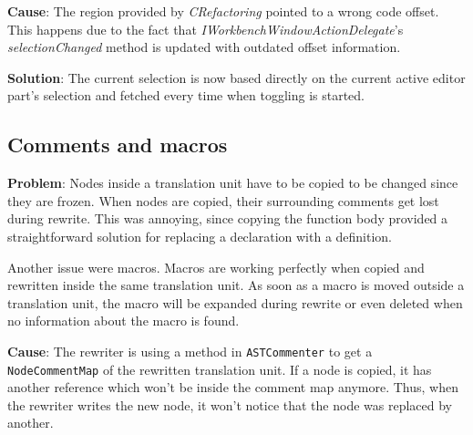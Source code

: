 \textbf{Cause}: The region provided by \textit{CRefactoring} pointed to a wrong 
code offset. This happens due to the fact that 
\textit{IWorkbenchWindowActionDelegate}'s \textit{selectionChanged} method is 
updated with outdated offset information.

\textbf{Solution}: The current selection is now based directly on the current 
active editor part's selection and fetched every time when toggling is started.

\subsection{Comments and macros}
\textbf{Problem}: Nodes inside a translation unit have to be copied to be 
changed since they are frozen. When nodes are copied, their surrounding comments 
get lost during rewrite\cite{Sommerlad:2008:RCR:1449814.1449817}. This was
annoying, since copying the function body provided a straightforward solution
for replacing a declaration with a definition.

Another issue were macros. Macros are working perfectly when copied and 
rewritten inside the same translation unit. As soon as a macro is moved outside 
a translation unit, the macro will be expanded during rewrite or even
deleted when no information about the macro is found.

\textbf{Cause}: The rewriter is using a method in \texttt{ASTCommenter} to get a 
\texttt{NodeCommentMap} of the rewritten translation unit. If a node is copied, 
it has another reference which won't be inside the comment map anymore. Thus, 
when the rewriter writes the new node, it won't notice that the node was 
replaced by another.


